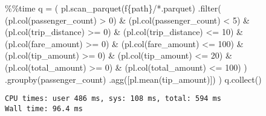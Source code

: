 \documentclass[
  letterpaper,
  DIV=11,
  numbers=noendperiod]{scrartcl}
\newenvironment{Shaded}{\begin{snugshade}}{\end{snugshade}}
\newcommand{\BuiltInTok}[1]{\textcolor[rgb]{0.00,0.23,0.31}{#1}}
\newcommand{\DecValTok}[1]{\textcolor[rgb]{0.68,0.00,0.00}{#1}}
\newcommand{\NormalTok}[1]{\textcolor[rgb]{0.00,0.23,0.31}{#1}}
\newcommand{\OperatorTok}[1]{\textcolor[rgb]{0.37,0.37,0.37}{#1}}
\newcommand{\SpecialCharTok}[1]{\textcolor[rgb]{0.37,0.37,0.37}{#1}}
\newcommand{\SpecialStringTok}[1]{\textcolor[rgb]{0.13,0.47,0.30}{#1}}
\newcommand{\StringTok}[1]{\textcolor[rgb]{0.13,0.47,0.30}{#1}}
\begin{document}
\begin{Shaded}
\begin{Highlighting}[]
\OperatorTok{\%\%}\NormalTok{time }
\NormalTok{q }\OperatorTok{=}\NormalTok{ (}
\NormalTok{    pl.scan\_parquet(}\SpecialStringTok{f\textquotesingle{}}\SpecialCharTok{\{}\NormalTok{path}\SpecialCharTok{\}}\SpecialStringTok{/*.parquet\textquotesingle{}}\NormalTok{)}
\NormalTok{    .}\BuiltInTok{filter}\NormalTok{(}
\NormalTok{        (pl.col(}\StringTok{\textquotesingle{}passenger\_count\textquotesingle{}}\NormalTok{) }\OperatorTok{\textgreater{}} \DecValTok{0}\NormalTok{) }\OperatorTok{\&}
\NormalTok{        (pl.col(}\StringTok{\textquotesingle{}passenger\_count\textquotesingle{}}\NormalTok{) }\OperatorTok{\textless{}} \DecValTok{5}\NormalTok{) }\OperatorTok{\&}
\NormalTok{        (pl.col(}\StringTok{\textquotesingle{}trip\_distance\textquotesingle{}}\NormalTok{) }\OperatorTok{\textgreater{}=} \DecValTok{0}\NormalTok{) }\OperatorTok{\&}
\NormalTok{        (pl.col(}\StringTok{\textquotesingle{}trip\_distance\textquotesingle{}}\NormalTok{) }\OperatorTok{\textless{}=} \DecValTok{10}\NormalTok{) }\OperatorTok{\&}
\NormalTok{        (pl.col(}\StringTok{\textquotesingle{}fare\_amount\textquotesingle{}}\NormalTok{) }\OperatorTok{\textgreater{}=} \DecValTok{0}\NormalTok{) }\OperatorTok{\&}
\NormalTok{        (pl.col(}\StringTok{\textquotesingle{}fare\_amount\textquotesingle{}}\NormalTok{) }\OperatorTok{\textless{}=} \DecValTok{100}\NormalTok{) }\OperatorTok{\&}
\NormalTok{        (pl.col(}\StringTok{\textquotesingle{}tip\_amount\textquotesingle{}}\NormalTok{) }\OperatorTok{\textgreater{}=} \DecValTok{0}\NormalTok{) }\OperatorTok{\&}
\NormalTok{        (pl.col(}\StringTok{\textquotesingle{}tip\_amount\textquotesingle{}}\NormalTok{) }\OperatorTok{\textless{}=} \DecValTok{20}\NormalTok{) }\OperatorTok{\&}
\NormalTok{        (pl.col(}\StringTok{\textquotesingle{}total\_amount\textquotesingle{}}\NormalTok{) }\OperatorTok{\textgreater{}=} \DecValTok{0}\NormalTok{) }\OperatorTok{\&}
\NormalTok{        (pl.col(}\StringTok{\textquotesingle{}total\_amount\textquotesingle{}}\NormalTok{) }\OperatorTok{\textless{}=} \DecValTok{100}\NormalTok{)}
\NormalTok{    )}
\NormalTok{    .groupby(}\StringTok{\textquotesingle{}passenger\_count\textquotesingle{}}\NormalTok{)}
\NormalTok{    .agg([pl.mean(}\StringTok{\textquotesingle{}tip\_amount\textquotesingle{}}\NormalTok{)])}
\NormalTok{    )}
\NormalTok{q.collect()}
\end{Highlighting}
\end{Shaded}

\begin{verbatim}
CPU times: user 486 ms, sys: 108 ms, total: 594 ms
Wall time: 96.4 ms
\end{verbatim}
\end{document}
